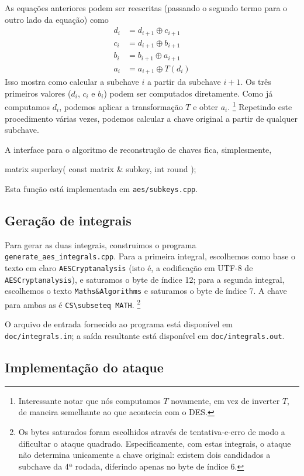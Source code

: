 \documentclass{article}
\newcommand{\xor}{\oplus}
\begin{document}
As equações anteriores podem ser reescritas
(passando o segundo termo para o outro lado da equação)
como
\begin{align*}
    d_i &= d_{i+1} \xor c_{i+1} \\
    c_i &= d_{i+1} \xor b_{i+1} \\
    b_i &= b_{i+1} \xor a_{i+1} \\
    a_i &= a_{i+1} \xor T(d_i)
\end{align*}
Isso mostra como calcular a subchave $i$ a partir da subchave $i+1$.
Os três primeiros valores ($d_i$, $c_i$ e $b_i$)
podem ser computados diretamente.
Como já computamos $d_i$, podemos aplicar a transformação $T$
e obter $a_i$.
\footnote{
    Interessante notar que nós computamos $T$ novamente,
    em vez de inverter $T$,
    de maneira semelhante ao que acontecia com o DES.
}
Repetindo este procedimento várias vezes,
podemos calcular a chave original a partir de qualquer subchave.

A interface para o algoritmo de reconstrução de chaves fica, simplesmente,
\begin{cppcode}
    matrix superkey( const matrix & subkey, int round );
\end{cppcode}
Esta função está implementada em \verb"aes/subkeys.cpp".

\subsection{Geração de integrais}

Para gerar as duas integrais, construimos o programa \verb"generate_aes_integrals.cpp".
Para a primeira integral, escolhemos como base o texto em claro
\verb"AESCryptanalysis"
(isto é, a codificação em UTF-8 de \verb"AESCryptanalysis"),
e saturamos o byte de índice 12;
para a segunda integral, escolhemos o texto \verb"Maths&Algorithms"
e saturamos o byte de índice 7.
A chave para ambas as é \verb"CS\subseteq MATH".
\footnote{
    Os bytes saturados foram escolhidos através de tentativa-e-erro
    de modo a dificultar o ataque quadrado.
    Especificamente,
    com estas integrais,
    o ataque não determina unicamente a chave original:
    existem dois candidados a subchave da 4ª rodada,
    diferindo apenas no byte de índice 6.
}

O arquivo de entrada fornecido ao programa está disponível em
\verb"doc/integrals.in";
a saída resultante está disponível em \verb"doc/integrals.out".

\subsection{Implementação do ataque}
\end{document}
